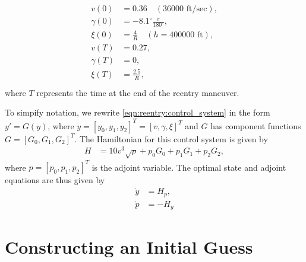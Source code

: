 \begin{align}
\begin{split}
	v(0) &= 0.36 \quad (36000 \text{ ft/sec}),\\
	\gamma(0) &= -8.1^\circ \frac{\pi}{180^\circ}, \\
	\xi(0)&= \frac{4}{R}\quad (h = 400000 \text{ ft}), \\
	v(T) &= 0.27,\\
	\gamma(T) &= 0, \\
	\xi(T)&= \frac{2.5}{R}, \\
\end{split}
\end{align}
where $T$ represents the time at the end of the reentry maneuver. 




To simpify notation, we rewrite \eqref{eqn:reentry:control_system} in the form $y' = G(y)$, where $y = [y_0, y_1, y_2]^T=[v,\gamma, \xi]^T$ and $G$ has component functions $G = [G_0, G_1, G_2]^T$. The Hamiltonian for this control system is given by 
\begin{align}
H &=  10v^3 \sqrt{\rho} + p_0G_0 + p_1G_1 + p_2G_2,
\end{align}
where $p = [p_0,p_1,p_2]^T$ is the adjoint variable. 
The optimal state and adjoint equations are thus given by 
\begin{align}
	\dot{y} &= H_{p},\\
	\dot{p} &= -H_{y} \label{eqn:reentry:adjoint_system}
\end{align}




\section*{Constructing an Initial Guess}











